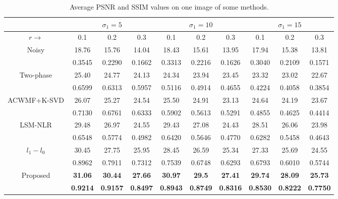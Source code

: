 \begin{table}[h!]
    \centering
    \begin{adjustbox}{max width=\textwidth}
    \begin{tabular}{|c||ccc|ccc|ccc|}
        \hline
            & \multicolumn{3}{c||}{$\sigma_1=5$} & \multicolumn{3}{c||}{$\sigma_1=10$} & \multicolumn{3}{c||}{$\sigma_1=15$}\\
        \hline        
        $r\rightarrow$ & 0.1 & 0.2 & 0.3 & 0.1 & 0.2 & 0.3 & 0.1 & 0.2 & 0.3\\
        \hline 
        \hline
        \multirow{2}{*}{Noisy} & 18.76 & 15.76 & 14.04 & 18.43 & 15.61 & 13.95 & 17.94 & 15.38 & 13.81\\
        & 0.3545 & 0.2290 & 0.1662 & 0.3313 & 0.2216 & 0.1626 & 0.3040 & 0.2109 & 0.1571\\
        \hline
        \multirow{2}{*}{Two-phase\cite{0884882828}} & 25.40 & 24.77 & 24.13 & 24.34 & 23.94 & 23.45 & 23.32 & 23.02 & 22.67\\
        & 0.6599 & 0.6313 & 0.5957 & 0.5116 & 0.4914 & 0.4655 & 0.4224 & 0.4058 & 0.3854\\
        \hline
        \multirow{2}{*}{ACWMF+K-SVD \cite{0884882844}\cite{0884882813}} & 26.07 & 25.27 & 24.54 & 25.50 & 24.91 & 23.13 & 24.64 & 24.19 & 23.67\\
        & 0.7130 & 0.6761 & 0.6333 & 0.5902 & 0.5613 & 0.5291 & 0.4855 & 0.4625 & 0.4414\\
        \hline    
        \multirow{2}{*}{LSM-NLR \cite{0884882826}} & 29.48 & 26.97 & 24.55 & 29.43 & 27.08 & 24.43 & 28.51 & 26.06 & 23.98\\
        & 0.6548 & 0.5774 & 0.4982 & 0.6420 & 0.5646 & 0.4770 & 0.6282 & 0.5458 & 0.4643\\
        \hline
        \multirow{2}{*}{$l_1-l_0$\cite{0884882829}} & 30.45 & 27.75 & 25.95 & 28.45 & 26.59 & 25.34 & 27.33 & 25.69 & 24.55\\
        & 0.8962 & 0.7911 & 0.7312 & 0.7539 & 0.6748 & 0.6293 & 0.6793 & 0.6010 & 0.5744\\
        \hline
        \multirow{2}{*}{Proposed} & \bfseries{31.06} & \bfseries{30.44} & \bfseries{27.66} & \bfseries{30.97} & \bfseries{29.5} & \bfseries{27.41} & \bfseries{29.74} & \bfseries{28.09} & \bfseries{25.73}\\
        & \bfseries{0.9214} & \bfseries{0.9157} & \bfseries{0.8497} & \bfseries{0.8943} & \bfseries{0.8749} & \bfseries{0.8316} & \bfseries{0.8530} & \bfseries{0.8222} & \bfseries{0.7750}\\
        \hline
    \end{tabular}
    \end{adjustbox}
    \caption{Average PSNR and SSIM values on one image of some methods.}
    \label{GNPINIndex}
\end{table}

